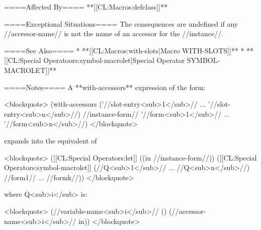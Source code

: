 ====Affected By====
**[[CL:Macros:defclass]]**

====Exceptional Situations====
The consequences are undefined if any //accessor-name// is not the name of an accessor for the //instance//.

====See Also====
  * **[[CL:Macros:with-slots|Macro WITH-SLOTS]]**
  * **[[CL:Special Operatoors:symbol-macrolet|Special Operator SYMBOL-MACROLET]]**

====Notes====
A **with-accessors** expression of the form:

<blockquote>
(with-accessors ('//slot-entry<sub>1</sub>// ... '//slot-entry<sub>n</sub>//) 
    //instance-form// 
  '//form<sub>1</sub>// ... '//form<sub>n</sub>//)
</blockquote>

expands into the equivalent of

<blockquote>
([[CL:Special Operators:let]] ((in //instance-form//))
  ([[CL:Special Operators:symbol-macrolet]] (//Q<sub>1</sub>// ... //Q<sub>n</sub>//) 
    //form1// ... //formk//))
</blockquote>

where Q<sub>i</sub> is:

<blockquote>
 (//variable-name<sub>i</sub>// () (//accessor-name<sub>i</sub>// in))
</blockquote>

